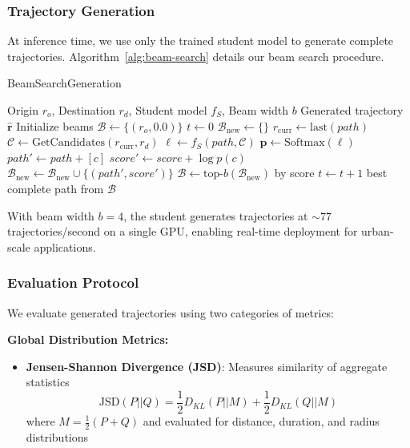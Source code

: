 \subsubsection{Trajectory Generation}
At inference time, we use only the trained student model to generate complete trajectories. Algorithm~\ref{alg:beam-search} details our beam search procedure.

\begin{algorithm}[t]
\caption{BeamSearchGeneration}
\label{alg:beam-search}
\begin{algorithmic}
\Require Origin $r_o$, Destination $r_d$, Student model $f_S$, Beam width $b$
\Ensure Generated trajectory $\hat{\mathbf{r}}$
\State Initialize beams $\mathcal{B} \gets \{(r_o, 0.0)\}$ 
\State $t \gets 0$
    \State $\mathcal{B}_{\text{new}} \gets \{\}$
        \State $r_{\text{curr}} \gets \text{last}(path)$
        \State $\mathcal{C} \gets \text{GetCandidates}(r_{\text{curr}}, r_d)$ 
        \State $\mathbf{\ell} \gets f_S(path, \mathcal{C})$ 
        \State $\mathbf{p} \gets \text{Softmax}(\mathbf{\ell})$
            \State $path' \gets path + [c]$
            \State $score' \gets score + \log p(c)$
            \State $\mathcal{B}_{\text{new}} \gets \mathcal{B}_{\text{new}} \cup \{(path', score')\}$
        \EndFor
    \EndFor
    \State $\mathcal{B} \gets \text{top-}b(\mathcal{B}_{\text{new}})$ by score
    \State $t \gets t + 1$
\EndWhile
\State \Return best complete path from $\mathcal{B}$
\end{algorithmic}
\end{algorithm}

\begin{remark}
With beam width $b=4$, the student generates trajectories at $\sim$77 trajectories/second on a single GPU, enabling real-time deployment for urban-scale applications.
\end{remark}

\subsubsection{Evaluation Protocol}
\label{sec:method-eval-metrics}
We evaluate generated trajectories using two categories of metrics:

\textbf{Global Distribution Metrics:}
\begin{itemize}[noitemsep,topsep=0pt]
\item \textbf{Jensen-Shannon Divergence (JSD)}: Measures similarity of aggregate statistics
  \begin{equation}
  \text{JSD}(P||Q) = \frac{1}{2}D_{KL}(P||M) + \frac{1}{2}D_{KL}(Q||M)
  \end{equation}
  where $M = \frac{1}{2}(P + Q)$ and evaluated for distance, duration, and radius distributions
\end{itemize}

